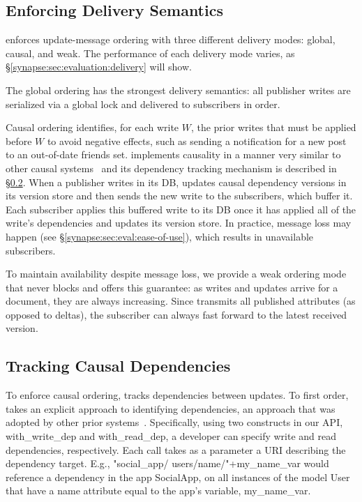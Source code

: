 \subsection{Enforcing Delivery Semantics} \label{synapse:sec:arch:cross-db-causality}

\synapse enforces update-message ordering with three different
delivery modes: global, causal, and weak. The performance of each delivery mode
varies, as \S\ref{synapse:sec:evaluation:delivery} will show.

The global ordering has the strongest delivery semantics: all publisher writes are serialized via a global lock and delivered to subscribers in order.

Causal ordering identifies, for each write $W$, the prior writes that must
be applied before $W$ to avoid negative effects, such as sending a notification
for a new post to an out-of-date friends set.
\synapse implements causality in a manner very similar to other
causal systems~\cite{ahamad1995causal,Birman:1991:LCA:128738.128742,eiger,bolton}
and its dependency tracking mechanism is described in \S\ref{synapse:sec:arch:deps}.
When a publisher writes in its DB, \synapse updates causal dependency versions in its
version store and then sends the new write to the subscribers, which buffer it.
Each subscriber applies this buffered write to its DB once it has applied all
of the write's dependencies and updates its version store.
In practice, message loss may happen (see \S\ref{synapse:sec:eval:ease-of-use}), which
results in unavailable subscribers.

To maintain availability despite message loss, we provide a weak
ordering mode that never blocks and offers this guarantee: as writes and
updates arrive for a document, they are always increasing.
Since \synapse transmits all published attributes (as opposed to deltas), the subscriber can always fast forward to the latest received version.

\subsection{Tracking Causal Dependencies} \label{synapse:sec:arch:deps}

To enforce causal ordering, \synapse tracks dependencies between updates.  To
first order, \synapse takes an explicit approach to identifying
dependencies, an approach that was adopted by other prior
systems~\cite{bolton,cops,Bailis:2012:PDC:2391229.2391251}.
Specifically, using two constructs in
our API, {\code with\_write\_dep} and {\code with\_read\_dep}, a developer
can specify write and read dependencies, respectively.  Each call takes as a
parameter a URI describing the dependency target. E.g.,
{\code"social\_app/ users/name/"+my\_name\_var} would reference a dependency in
the app {\code SocialApp}, on all instances of the model {\code User} that have
a {\code name} attribute equal to the app's variable, {\code my\_name\_var}.

